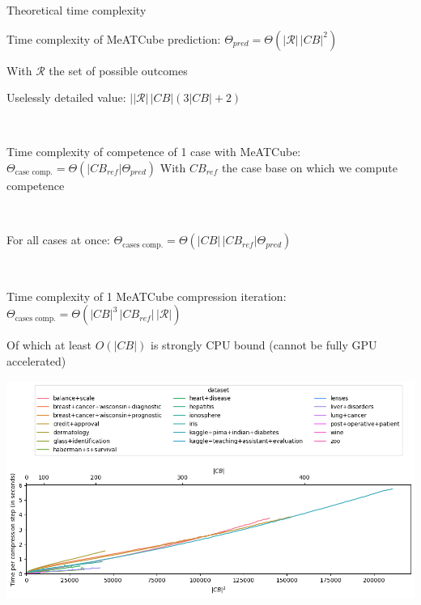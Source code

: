 \documentclass[]{beamer}
\def\outcomes{\mathcal{R}}
\begin{document}
\begin{frame}{Theoretical time complexity}


    Time complexity of MeATCube prediction:
    $\Theta_{pred} = \Theta(|\outcomes|\,|CB|^2)$
    
    With $\outcomes$ the set of possible outcomes

    {\smaller\smaller\color{gray}
    Uselessly detailed value:
    $||\outcomes|\,|CB|(3|CB| + 2)$}

    ~

    Time complexity of competence of 1 case with MeATCube:
    $\Theta_\text{case comp.} = \Theta({|CB_{ref}|} \Theta_{pred})$
    With $CB_{ref}$ the case base on which we compute competence

    ~

    For all cases at once:
    $\Theta_\text{cases comp.} = \Theta({|CB|}\,|CB_{ref}| \Theta_{pred})$

~

\begin{block}{Time complexity of 1 MeATCube compression iteration:}
    $\Theta_\text{cases comp.} = \Theta({|CB|}^3\,|CB_{ref}|\,|\outcomes|)$
\end{block}

    {Of which at least $O({|CB|})$ is strongly CPU bound (cannot be fully GPU accelerated)}


    

\end{frame}

\begin{frame}{}

    \includegraphics[width=\textwidth]{../results-no-sim-tuning+/figs/runtime-square.png}
    
\end{frame}
\end{document}
